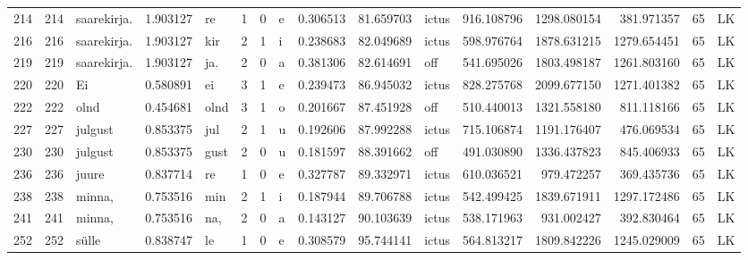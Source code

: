 \begin{tabular}{lrlrllllrrlrrrll}
214  &         214 &      saarekirja. &  1.903127 &      re &        1 &      0 &       e &      0.306513 &     81.659703 &  ictus &   916.108796 &  1298.080154 &   381.971357 &     65 &        LK \\
216  &         216 &      saarekirja. &  1.903127 &     kir &        2 &      1 &       i &      0.238683 &     82.049689 &  ictus &   598.976764 &  1878.631215 &  1279.654451 &     65 &        LK \\
219  &         219 &      saarekirja. &  1.903127 &     ja. &        2 &      0 &       a &      0.381306 &     82.614691 &    off &   541.695026 &  1803.498187 &  1261.803160 &     65 &        LK \\
220  &         220 &               Ei &  0.580891 &      ei &        3 &      1 &       e &      0.239473 &     86.945032 &  ictus &   828.275768 &  2099.677150 &  1271.401382 &     65 &        LK \\
222  &         222 &             olnd &  0.454681 &    olnd &        3 &      1 &       o &      0.201667 &     87.451928 &    off &   510.440013 &  1321.558180 &   811.118166 &     65 &        LK \\
227  &         227 &          julgust &  0.853375 &     jul &        2 &      1 &       u &      0.192606 &     87.992288 &  ictus &   715.106874 &  1191.176407 &   476.069534 &     65 &        LK \\
230  &         230 &          julgust &  0.853375 &    gust &        2 &      0 &       u &      0.181597 &     88.391662 &    off &   491.030890 &  1336.437823 &   845.406933 &     65 &        LK \\
236  &         236 &            juure &  0.837714 &      re &        1 &      0 &       e &      0.327787 &     89.332971 &  ictus &   610.036521 &   979.472257 &   369.435736 &     65 &        LK \\
238  &         238 &           minna, &  0.753516 &     min &        2 &      1 &       i &      0.187944 &     89.706788 &  ictus &   542.499425 &  1839.671911 &  1297.172486 &     65 &        LK \\
241  &         241 &           minna, &  0.753516 &     na, &        2 &      0 &       a &      0.143127 &     90.103639 &  ictus &   538.171963 &   931.002427 &   392.830464 &     65 &        LK \\
252  &         252 &            sülle &  0.838747 &      le &        1 &      0 &       e &      0.308579 &     95.744141 &  ictus &   564.813217 &  1809.842226 &  1245.029009 &     65 &        LK \\

\end{tabular}
